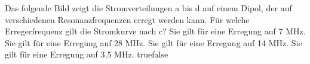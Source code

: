     {Das folgende Bild zeigt die Stromverteilungen a bis d auf einem Dipol, der auf verschiedenen Resonanzfrequenzen erregt werden kann. Für welche Erregerfrequenz gilt die Stromkurve nach c?}
    {Sie gilt für eine Erregung auf 7 MHz.}
    {Sie gilt für eine Erregung auf 28 MHz.}
    {Sie gilt für eine Erregung auf 14 MHz.}
    {Sie gilt für eine Erregung auf 3,5 MHz.}
    {true}{false}